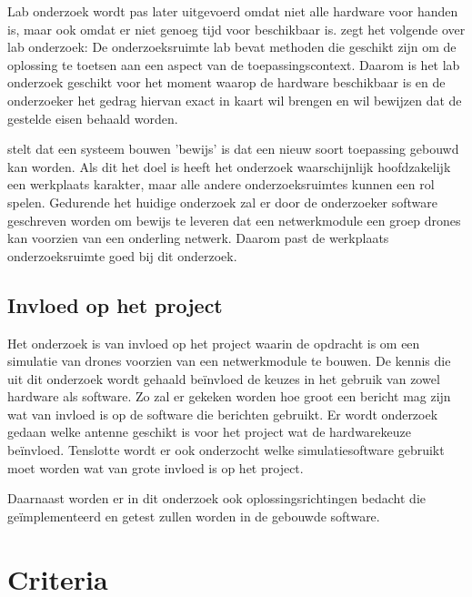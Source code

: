 \documentclass[a4paper, 11pt, oneside]{report}
\begin{document}
Lab onderzoek wordt pas later uitgevoerd omdat niet alle hardware voor handen is, maar ook omdat er niet genoeg tijd voor beschikbaar is.
\citeauthor{MethodenKaart} zegt het volgende over lab onderzoek: De onderzoeksruimte lab bevat methoden die geschikt zijn om de oplossing te toetsen aan een aspect van de toepassingscontext.
Daarom is het lab onderzoek geschikt voor het moment waarop de hardware beschikbaar is en de onderzoeker het gedrag hiervan exact in kaart wil brengen en wil bewijzen dat de gestelde eisen behaald worden.

 stelt dat een systeem bouwen 'bewijs' is dat een nieuw soort toepassing gebouwd kan worden. Als dit het doel is heeft het onderzoek waarschijnlijk hoofdzakelijk een werkplaats karakter, maar alle andere onderzoeksruimtes kunnen een rol spelen.
Gedurende het huidige onderzoek zal er door de onderzoeker software geschreven worden om bewijs te leveren dat een netwerkmodule een groep drones kan voorzien van een onderling netwerk.
Daarom past de werkplaats onderzoeksruimte goed bij dit onderzoek.


\section{Invloed op het project}

Het onderzoek is van invloed op het project waarin de opdracht is om een simulatie van drones voorzien van een netwerkmodule te bouwen.
De kennis die uit dit onderzoek wordt gehaald beïnvloed de keuzes in het gebruik van zowel hardware als software. 
Zo zal er gekeken worden hoe groot een bericht mag zijn wat van invloed is op de software die berichten gebruikt.
Er wordt onderzoek gedaan welke antenne geschikt is voor het project wat de hardwarekeuze beïnvloed.
Tenslotte wordt er ook onderzocht welke simulatiesoftware gebruikt moet worden wat van grote invloed is op het project.

Daarnaast worden er in dit onderzoek ook oplossingsrichtingen bedacht die geïmplementeerd en getest zullen worden in de gebouwde software. 

\chapter{Criteria}
\label{chapter:criteria}
\end{document}
